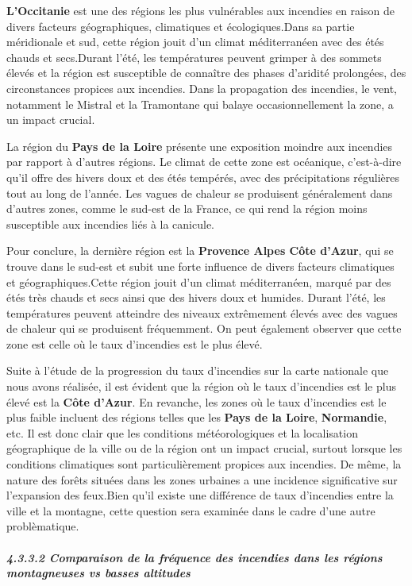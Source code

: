 \documentclass[
]{article}
\begin{document}
\textbf{L'Occitanie} est une des régions les plus vulnérables aux
incendies en raison de divers facteurs géographiques, climatiques et
écologiques.Dans sa partie méridionale et sud, cette région jouit d'un
climat méditerranéen avec des étés chauds et secs.Durant l'été, les
températures peuvent grimper à des sommets élevés et la région est
susceptible de connaître des phases d'aridité prolongées, des
circonstances propices aux incendies. Dans la propagation des incendies,
le vent, notamment le Mistral et la Tramontane qui balaye
occasionnellement la zone, a un impact crucial.

La région du \textbf{Pays de la Loire} présente une exposition moindre
aux incendies par rapport à d'autres régions. Le climat de cette zone
est océanique, c'est-à-dire qu'il offre des hivers doux et des étés
tempérés, avec des précipitations régulières tout au long de l'année.
Les vagues de chaleur se produisent généralement dans d'autres zones,
comme le sud-est de la France, ce qui rend la région moins susceptible
aux incendies liés à la canicule.

Pour conclure, la dernière région est la \textbf{Provence Alpes Côte
d'Azur}, qui se trouve dans le sud-est et subit une forte influence de
divers facteurs climatiques et géographiques.Cette région jouit d'un
climat méditerranéen, marqué par des étés très chauds et secs ainsi que
des hivers doux et humides. Durant l'été, les températures peuvent
atteindre des niveaux extrêmement élevés avec des vagues de chaleur qui
se produisent fréquemment. On peut également observer que cette zone est
celle où le taux d'incendies est le plus élevé.

Suite à l'étude de la progression du taux d'incendies sur la carte
nationale que nous avons réalisée, il est évident que la région où le
taux d'incendies est le plus élevé est la \textbf{Côte d'Azur}. En
revanche, les zones où le taux d'incendies est le plus faible incluent
des régions telles que les \textbf{Pays de la Loire},
\textbf{Normandie}, etc. Il est donc clair que les conditions
météorologiques et la localisation géographique de la ville ou de la
région ont un impact crucial, surtout lorsque les conditions climatiques
sont particulièrement propices aux incendies. De même, la nature des
forêts situées dans les zones urbaines a une incidence significative sur
l'expansion des feux.Bien qu'il existe une différence de taux
d'incendies entre la ville et la montagne, cette question sera examinée
dans le cadre d'une autre problèmatique.

\subparagraph{4.3.3.2 Comparaison de la fréquence des incendies dans les
régions montagneuses vs basses
altitudes}\label{comparaison-de-la-fruxe9quence-des-incendies-dans-les-ruxe9gions-montagneuses-vs-basses-altitudes}
\end{document}
